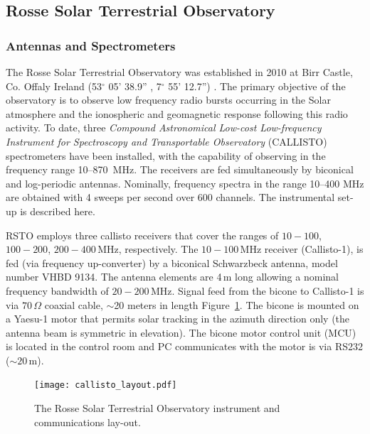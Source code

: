 \subsection{Rosse Solar Terrestrial Observatory}\label{sec:30}

\subsubsection{Antennas and Spectrometers}
The Rosse Solar Terrestrial Observatory was established in 2010 at Birr Castle, Co. Offaly Ireland (53$^{\circ}$ 05' 38.9'' , 7$^{\circ}$ 55' 12.7'') \citep{zucca2012}. The primary objective of the observatory is to observe low frequency radio bursts occurring in the Solar atmosphere and the ionospheric and geomagnetic response following this radio activity.  To date, three \textit{Compound Astronomical Low-cost Low-frequency Instrument for Spectroscopy and Transportable Observatory} (CALLISTO) spectrometers have been installed, with the capability of observing in the frequency range 10--870~MHz. The receivers are fed simultaneously by biconical and log-periodic antennas. Nominally, frequency spectra in the range 10--400 MHz are obtained with 4 sweeps per second over 600 channels. The instrumental set-up is described here.

RSTO employs three callisto receivers that cover the ranges of $10-100$, $100-200$, $200-400$\,MHz, respectively. The $10-100$\,MHz receiver (Callisto-1), is fed (via frequency up-converter) by a biconical Schwarzbeck antenna, model number VHBD 9134. The antenna elements are 4\,m long allowing a nominal frequency bandwidth of $20-200$\,MHz. Signal feed from the bicone to Callisto-1 is via $70\,\Omega$ coaxial cable, $\sim$20 meters in length Figure~\ref{fig:rsto_layout}. The bicone is mounted on a Yaesu-1 motor that permits solar tracking in the azimuth direction only (the antenna beam is symmetric in elevation). The bicone motor control unit (MCU) is located in the control room and PC communicates with the motor is via RS232 ($\sim20$\,m).
\begin{figure}[!t]
\begin{center}
\texttt{[image: callisto\_layout.pdf]}
\caption[RSTO Instrumental Setup]{The Rosse Solar Terrestrial Observatory instrument and communications lay-out.}
\label{fig:rsto_layout}
\end{center}
\end{figure}

